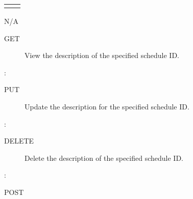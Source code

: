 \documentclass[letterpaper,10pt,english]{sphinxmanual}
\begin{document}
\begin{savenotes}\sphinxattablestart
\centering
\begin{tabulary}{\linewidth}[t]{|T|T|}
\hline

&
\\
\hline&\\
\hline
\end{tabulary}
\par
\sphinxattableend\end{savenotes}

 N/A
\begin{description}
\item[{ GET}] \leavevmode
View the description of the specified schedule ID.

\end{description}

:

\begin{sphinxVerbatim}[commandchars=\\\{\}]
\end{sphinxVerbatim}
\begin{description}
\item[{ PUT}] \leavevmode
Update the description for the specified schedule ID.

\end{description}

:

\begin{sphinxVerbatim}[commandchars=\\\{\}]
\end{sphinxVerbatim}
\begin{description}
\item[{ DELETE}] \leavevmode
Delete the description of the specified schedule ID.

\end{description}

:

\begin{sphinxVerbatim}[commandchars=\\\{\}]
\end{sphinxVerbatim}

 POST
\end{document}
